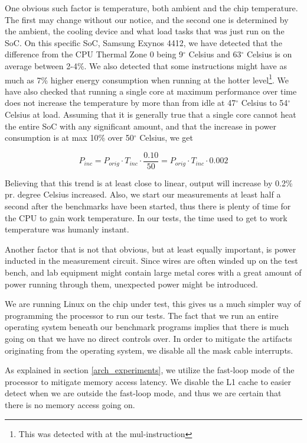 One obvious such factor is temperature, both ambient and the chip temperature.
The first may change without our notice, and the second one is determined by the
ambient, the cooling device and what load tasks that was just run on the SoC. On
this specific SoC, Samsung Exynos 4412, we have detected that the difference
from the CPU Thermal Zone 0 being 9$^\circ$ Celsius and 63$^\circ$ Celsius is on
average between 2-4\%. We also detected that some instructions might have as
much as 7\% higher energy consumption when running at the hotter
level\footnote{This was detected with at the {\ttfamily mul}-instruction}. We
have also checked that running a single core at maximum performance over time
does not increase the temperature by more than from idle at 47$^\circ$ Celsius
to 54$^\circ$ Celsius at load. Assuming that it is generally true that a single
core cannot heat the entire SoC with any significant amount, and that the
increase in power consumption is at max 10\% over 50$^\circ$ Celsius, we get

\begin{equation}
    P_{inc} = P_{orig} \cdot T_{inc} \cdot \frac{0.10}{50} = P_{orig} \cdot T_{inc} \cdot 0.002
\end{equation}

Believing that this trend is at least close to linear, output will increase by
0.2\% pr.  degree Celsius increased. Also, we start our measurements at least
half a second after the benchmarks have been started, thus there is plenty of
time for the CPU to gain work temperature. In our tests, the time used to get to
work temperature was humanly instant.

Another factor that is not that obvious, but at least equally important, is
power inducted in the measurement circuit. Since wires are often winded up on
the test bench, and lab equipment might contain large metal cores with a great
amount of power running through them, unexpected power might be introduced.

We are running Linux on the chip under test, this gives us a much simpler way of
programming the processor to run our tests. The fact that we run an entire
operating system beneath our benchmark programs implies that there is much going
on that we have no direct controls over.  In order to mitigate the artifacts
originating from the operating system, we disable all the mask cable interrupts.

As explained in section \ref{arch_experiments}, we utilize the fast-loop mode of
the processor to mitigate memory access latency. We disable the L1 cache to
easier detect when we are outside the fast-loop mode, and thus we are certain
that there is no memory access going on.
